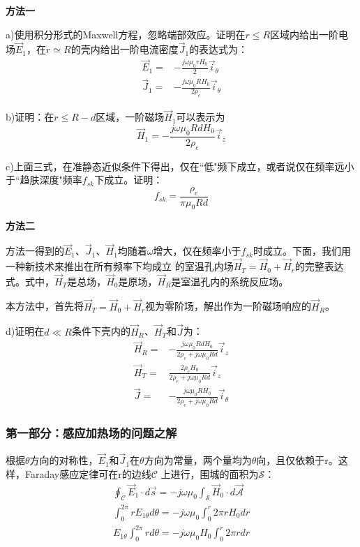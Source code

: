 \textbf{方法一}

a)使用积分形式的Maxwell方程，忽略端部效应。证明在$r\le R$区域内给出一阶电场$\vec{E}_1$，在$r\simeq R$的壳内给出一阶电流密度$\vec{J}_1$的表达式为：
\begin{align}
\vec{E}_1=&-\frac{j\omega \mu_0 r H_0}{2} \vec{i}_\theta\\
\vec{J}_1=&-\frac{j\omega \mu_0 R H_0}{2\rho_e} \vec{i}_\theta
\end{align}

b)证明：在$r\le R-d$区域，一阶磁场$\vec{H}_1$可以表示为
\begin{equation}
\vec{H}_1=-\frac{j\omega \mu_0 R d H_0}{2\rho_e}\vec{i}_z
\end{equation} 

c)上面三式，在准静态近似条件下得出，仅在``低"频下成立，或者说仅在频率远小于``趋肤深度"频率$f_{sk}$下成立。证明：
\begin{equation}
f_{sk}=\frac{\rho_e}{\pi \mu_0 R d}
\end{equation}

\textbf{方法二}

方法一得到的$\vec{E}_1$、$\vec{J}_1$、$\vec{H}_1$均随着$\omega$增大，仅在频率小于$f_{sk}$时成立。下面，我们用一种新技术来推出在所有频率下均成立
的室温孔内场$\vec{H}_T=\vec{H}_0+\vec{H}_r$的完整表达式。式中，$\vec{H}_T$是总场，$\vec{H}_0$是原场，$\vec{H}_R$是室温孔内的系统反应场。

本方法中，首先将$\vec{H}_T=\vec{H}_0+\vec{H}_r$视为零阶场，解出作为一阶磁场响应的$\vec{H}_R$。

d)证明在$d\ll R$条件下壳内的$\vec{H}_R$、$\vec{H}_T$和$\vec{J}$为：
\begin{align}
\vec{H}_R=&-\frac{j\omega \mu_0 R d H_0}{2\rho_e+j\omega \mu_0 R d} \vec{i}_z\\
\vec{H}_T=&\frac{2\rho_e H_0}{2\rho_e+j\omega \mu_0 R d} \vec{i}_z\\
\vec{J}=&-\frac{j\omega \mu_0 R H_0}{2\rho_e+j\omega \mu_0 R d} \vec{i}_\theta
\end{align}

\subsubsection*{第一部分：感应加热场的问题之解}
根据$\theta$方向的对称性，$\vec{E}_1$和$\vec{J}_1$在$\theta$方向为常量，两个量均为$\theta$向，且仅依赖于r。这样，Faraday感应定律可在r的边线$\mathcal{C}$
上进行，围城的面积为$\mathcal{S}$：
\begin{align}
\oint_{\mathcal{C}} \vec{E}_1 \cdot d\vec{s}=-j\omega \mu_0 \int_{\mathcal{S}} \vec{H}_0 \cdot d\vec{\mathcal{A}}\nonumber\\
\int_{0}^{2\pi} r E_{1\theta} d\theta=-j\omega \mu_0 \int_{0}^{r} 2\pi r H_0 dr\nonumber\\
E_{1\theta}\int_{0}^{2\pi} r d\theta=-j\omega \mu_0 H_0\int_{0}^{r} 2\pi r dr\nonumber\tag{S7.1}
\end{align}

